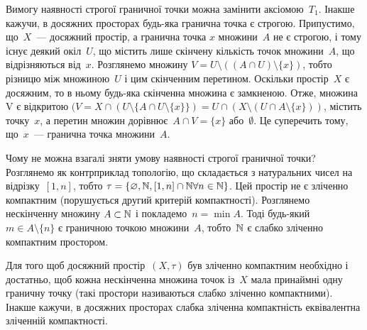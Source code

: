 \begin{remark}
Вимогу наявності строгої граничної
точки можна замінити аксіомою~$T_1$. Інакше кажучи, в
досяжних просторах будь-яка гранична точка є строгою.
Припустимо, що~$X$~--- досяжний простір, а гранична точка
$x$ множини~$A$ не є строгою, і тому існує деякий окіл~$U$, що
містить лише скінчену кількість точок множини~$A$, що
відрізняються від~$x$. Розглянемо множину
$V = U \setminus ((A \cap U) \setminus \{x\})$,
тобто різницю між множиною~$U$ і
цим скінченним перетином. Оскільки простір~$X$ є
досяжним, то в ньому будь-яка скінченна множина є
замкненою. Отже, множина V є відкритою
$(V = X \cap (U \setminus \{A \cap U \setminus \{x\}\}) =
U \cap (X \setminus (U \cap A \setminus \{x\}))$, містить
точку~$x$, а перетин множин дорівнює~$A \cap V = \{x\}$ або~$\emptyset$. Це
суперечить тому, що~$x$~--- гранична точка множини~$A$.
\end{remark}

\begin{remark}
Чому не можна взагалі зняти умову
наявності строгої граничної точки? Розглянемо як
контрприклад топологію, що складається з натуральних
чисел на відрізку~$[1, n]$, тобто
$\tau = \{\varnothing, \mathbb{N}, [1, n] \cap \mathbb{N} \forall n \in \mathbb{N}\}$.
Цей простір не є зліченно компактним (порушується другий
критерій компактності). Розглянемо нескінченну множину
$A \subset \mathbb{N}$ і покладемо~$n = \min A$.
Тоді будь-який~$m \in A \setminus \{n\}$ є
граничною точкою множини~$A$, тобто~$\mathbb{N}$ є слабко зліченно
компактним простором.
\end{remark}

\begin{theorem}
Для того щоб досяжний простір~$(X, \tau)$ був
зліченно компактним необхідно і достатньо, щоб кожна
нескінченна множина точок із~$X$ мала принаймні одну
граничну точку (такі простори називаються слабко
зліченно компактними). Інакше кажучи, в досяжних
просторах слабка зліченна компактність еквівалентна
зліченній компактності.
\end{theorem}

